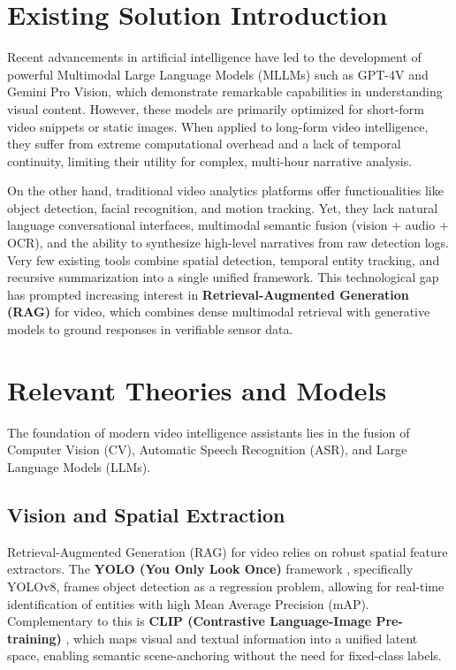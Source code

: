 \section{Existing Solution Introduction}
Recent advancements in artificial intelligence have led to the development of powerful Multimodal Large Language Models (MLLMs) such as GPT-4V and Gemini Pro Vision, which demonstrate remarkable capabilities in understanding visual content. However, these models are primarily optimized for short-form video snippets or static images. When applied to long-form video intelligence, they suffer from extreme computational overhead and a lack of temporal continuity, limiting their utility for complex, multi-hour narrative analysis.

On the other hand, traditional video analytics platforms offer functionalities like object detection, facial recognition, and motion tracking. Yet, they lack natural language conversational interfaces, multimodal semantic fusion (vision + audio + OCR), and the ability to synthesize high-level narratives from raw detection logs. Very few existing tools combine spatial detection, temporal entity tracking, and recursive summarization into a single unified framework. This technological gap has prompted increasing interest in \textbf{Retrieval-Augmented Generation (RAG)} for video, which combines dense multimodal retrieval with generative models to ground responses in verifiable sensor data.

\section{Relevant Theories and Models}
The foundation of modern video intelligence assistants lies in the fusion of Computer Vision (CV), Automatic Speech Recognition (ASR), and Large Language Models (LLMs). 

\subsection{Vision and Spatial Extraction}
Retrieval-Augmented Generation (RAG) for video relies on robust spatial feature extractors. The \textbf{YOLO (You Only Look Once)} framework \cite{yolov8}, specifically YOLOv8, frames object detection as a regression problem, allowing for real-time identification of entities with high Mean Average Precision (mAP). Complementary to this is \textbf{CLIP (Contrastive Language-Image Pre-training)} \cite{clip}, which maps visual and textual information into a unified latent space, enabling semantic scene-anchoring without the need for fixed-class labels.

